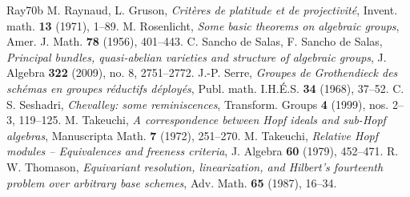 \begin{thebibliography}{Ray70b}
M. Raynaud, L. Gruson, \emph{Critères de platitude et de projectivité}, Invent. math. \textbf{13} (1971), 1--89.
M. Rosenlicht, \emph{Some basic theorems on algebraic groups}, Amer. J. Math. \textbf{78} (1956), 401--443.
C. Sancho de Salas, F. Sancho de Salas, \emph{Principal bundles, quasi-abelian varieties and structure of algebraic groups}, J. Algebra \textbf{322} (2009), no. 8, 2751--2772.
J.-P. Serre, \emph{Groupes de Grothendieck des schémas en groupes réductifs déployés}, Publ. math. I.H.É.S. \textbf{34} (1968), 37--52.
C. S. Seshadri, \emph{Chevalley: some reminiscences}, Transform. Groups \textbf{4} (1999), nos. 2--3, 119--125.
M. Takeuchi, \emph{A correspondence between Hopf ideals and sub-Hopf algebras}, Manuscripta Math. \textbf{7} (1972), 251--270.
M. Takeuchi, \emph{Relative Hopf modules -- Equivalences and freeness criteria}, J. Algebra \textbf{60} (1979), 452--471.
R. W. Thomason, \emph{Equivariant resolution, linearization, and Hilbert's fourteenth problem over arbitrary base schemes}, Adv. Math. \textbf{65} (1987), 16--34.
\end{thebibliography}

